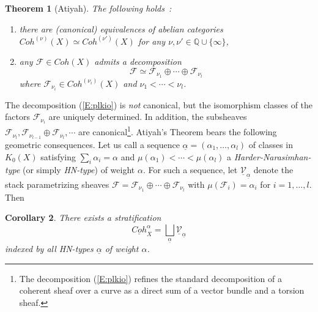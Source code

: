 \documentclass[a4paper,10pt]{amsart}
\def\a{\alpha}
\newtheorem{theo}{\bf{Theorem}}[section]
\newtheorem{cor}[theo]{Corollary}
\numberwithin{equation}{section}
\begin{document}
\vspace{.1in}

\begin{theo}[Atiyah] The following holds~:
\begin{enumerate}
\item[i)] there are (canonical) equivalences of abelian categories $Coh^{(\nu)}(X) \simeq Coh^{(\nu')}(X)$ for any $\nu,\nu' \in \mathbb{Q} \cup \{\infty\}$,
\item[ii)] any $\mathcal{F} \in Coh(X)$ admits a decomposition
\begin{equation}\label{E:plkio}
\mathcal{F} \simeq \mathcal{F}_{\nu_1} \oplus \cdots \oplus \mathcal{F}_{\nu_l}
\end{equation}
where $\mathcal{F}_{\nu_i} \in Coh^{(\nu_i)}(X)$ and $\nu_1 < \cdots < \nu_l$.
\end{enumerate}
\end{theo}
 
 The decomposition (\ref{E:plkio}) is \textit{not} canonical, but the isomorphism classes of the factors $\mathcal{F}_{\nu_i}$ are uniquely determined. In addition, the subsheaves $\mathcal{F}_{\nu_l}, \mathcal{F}_{\nu_{l-1}} \oplus \mathcal{F}_{\nu_l}, \cdots$ are canonical\footnote{The decomposition (\ref{E:plkio}) refines the standard decomposition of a coherent sheaf over a curve as a direct sum of a vector bundle and a torsion sheaf.}. Atiyah's Theorem bears the following geometric consequences. Let us call a sequence $\underline{\a}=(\a_1, \ldots, \a_l)$ of classes in $K_0(X)$ satisfying $\sum_i \a_i=\a$ and $\mu(\a_1)< \cdots < \mu(\a_l)$ a \textit{Harder-Narasimhan-type} (or simply \textit{HN-type}) of weight $\a$. For such a sequence, let $\underline{\mathcal{V}}_{\underline{\a}}$ denote the stack parametrizing sheaves
$\mathcal{F}= \mathcal{F}_{\nu_1} \oplus \cdots \oplus \mathcal{F}_{\nu_l}$ with $\mu(\mathcal{F}_i)=\a_i$ for $i=1, \ldots, l$. Then
 
\vspace{.1in}

\begin{cor}  There exists a stratification
$$\underline{Coh}^{\a}_{X} = \bigsqcup_{\underline{\a}} \underline{\mathcal{V}}_{\underline{\a}}$$
indexed by all HN-types $\underline{\a}$ of weight $\a$.
\end{cor}
\end{document}
